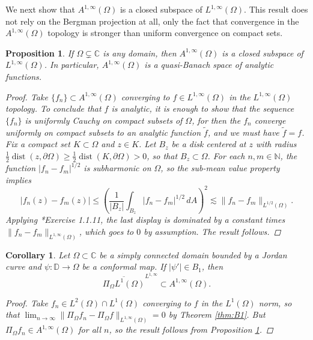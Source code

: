 \documentclass{amsart}
\newtheorem{corollary}[theorem]{Corollary}
\newtheorem{proposition}[theorem]{Proposition}
\theoremstyle{definition}
\numberwithin{equation}{section}
\begin{document}
We next show that $A^{1,\infty}(\Omega)$ is a closed subspace of $L^{1,\infty}(\Omega)$. This result does not rely on the Bergman projection at all, only the fact that convergence in the $A^{1,\infty}(\Omega)$ topology is stronger than uniform convergence on compact sets.
\begin{proposition} \label{ClosedQuasiBanach}
 If $\Omega \subsetneq \mathbb C$ is any domain, then $A^{1,\infty}(\Omega)$ is a closed subspace of $L^{1,\infty}(\Omega)$. 
 In particular, $A^{1,\infty}(\Omega)$ is a quasi-Banach space of analytic functions. 
\begin{proof}
Take $\{f_n\} \subset A^{1,\infty}(\Omega)$ converging to $f \in L^{1,\infty}(\Omega)$ in the $L^{1,\infty}(\Omega)$ topology. To conclude that $f$ is analytic, it is enough to show that the sequence $\{f_n\}$ is uniformly Cauchy on compact subsets of $\Omega$, for then the $f_n$ converge uniformly on compact subsets to an analytic function $\widetilde{f}$, and we must have $\widetilde{f}=f$. 
Fix a compact set $K\subset \Omega$ and $z \in K$. Let $B_z$ be a disk centered at $z$ with radius $\frac{1}{2} \operatorname{dist}(z, \partial \Omega) \geq \frac{1}{2} \operatorname{dist}(K, \partial \Omega)>0$, so that $B_z \subset \Omega$. For each $n,m \in \mathbb{N}$, the function $|f_n-f_m|^{1/2}$ is subharmonic on $\Omega$, so the sub-mean value property implies 
$$ |f_n(z)-f_m(z)| \leq \left( \frac{1}{|B_z|}\int_{B_z} |f_n-f_m|^{1/2} \, dA \right)^2 \lesssim \|f_n-f_m\|_{L^{1/2}(\Omega)}.$$
Applying \cite{Gra14}*{Exercise 1.1.11}, the last display is dominated by a constant times $\|f_n-f_m\|_{L^{1,\infty}(\Omega)}$, which goes to $0$ by assumption. The result follows. 
\end{proof}
\end{proposition}

\begin{corollary} \label{c:PiOmegaClosure}
Let $\Omega \subset \mathbb C$ be a simply connected domain bounded by a Jordan curve and $\psi\colon \mathbb D \to \Omega$ be a conformal map. If $|\psi'| \in B_1$, then $$ \overline{\Pi_\Omega L^1(\Omega)}^{L^{1,\infty}} \subset A^{1,\infty}(\Omega).$$
\begin{proof}
Take $f_n \in L^2(\Omega) \cap L^1(\Omega)$ converging to $f$ in the $L^1(\Omega)$ norm, so that $\lim_{n \rightarrow \infty} \|\Pi_\Omega f_n-\Pi_\Omega f\|_{L^{1,\infty}(\Omega)}=0$ by Theorem \ref{thm:B1}. But $\Pi_\Omega f_n \in A^{1,\infty}(\Omega)$ for all $n$, so the result follows from Proposition \ref{ClosedQuasiBanach}. 
\end{proof}
\end{corollary}
\end{document}

